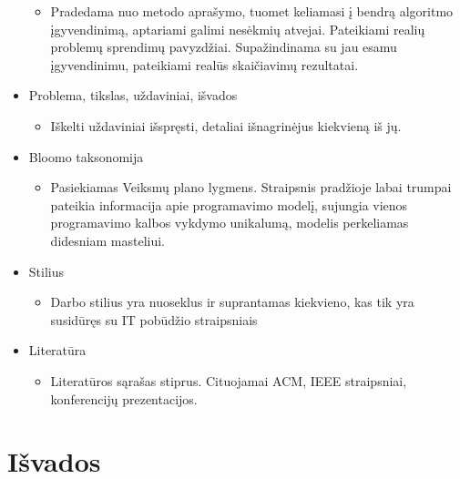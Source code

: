 \documentclass[10pt, onecolumn]{IEEEtran}
\begin{document}
\begin{itemize}
	        \begin{itemize}
	          \item Pradedama nuo metodo aprašymo, tuomet keliamasi į bendrą algoritmo įgyvendinimą, aptariami galimi nesėkmių atvejai. Pateikiami realių problemų sprendimų pavyzdžiai. Supažindinama su jau esamu įgyvendinimu, pateikiami realūs skaičiavimų rezultatai.
	        \end{itemize}
	      \item Problema, tikslas, uždaviniai, išvados
	        \begin{itemize}
	          \item Iškelti uždaviniai išspręsti, detaliai išnagrinėjus kiekvieną iš jų.
	        \end{itemize}
	      \item Bloomo taksonomija
	        \begin{itemize}
	          \item Pasiekiamas Veiksmų plano lygmens. Straipsnis pradžioje labai trumpai pateikia informacija apie programavimo modelį, sujungia vienos programavimo kalbos vykdymo unikalumą, modelis perkeliamas didesniam masteliui.
	        \end{itemize}
	      \item Stilius
	        \begin{itemize}
	          \item Darbo stilius yra nuoseklus ir suprantamas kiekvieno, kas tik yra susidūręs su IT pobūdžio straipsniais
	        \end{itemize}
	      \item Literatūra
	        \begin{itemize}
	          \item Literatūros sąrašas stiprus. Cituojamai ACM, IEEE straipsniai, konferencijų prezentacijos.
	        \end{itemize}
	    \end{itemize}

	\section{Išvados}
\end{document}
